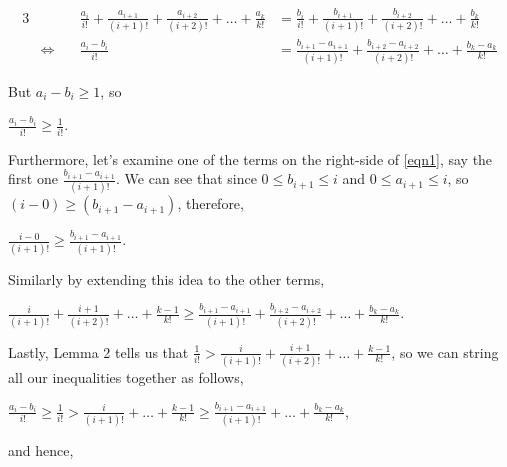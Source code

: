 \documentclass{article}
\begin{document}
{\footnotesize
\bgroup
\setlength{\abovedisplayskip}{0pt}
\setlength{\belowdisplayskip}{0pt}
\begin{alignat}{3}
  &&\frac{a_i}{i!}
  + \frac{a_{i+1}}{(i+1)!}
  + \frac{a_{i+2}}{(i+2)!}
  + \dots{}
  + \frac{a_k}{k!}
  &= \frac{b_i}{i!}
  + \frac{b_{i+1}}{(i+1)!}
  + \frac{b_{i+2}}{(i+2)!}
  + \dots{}
  + \frac{b_k}{k!} \nonumber \\
  &\Leftrightarrow\quad &\frac{a_i - b_i}{i!}
  &= \frac{b_{i+1} - a_{i+1}}{(i+1)!}
  + \frac{b_{i+2} - a_{i+2}}{(i+2)!}
  + \dots{}
  + \frac{b_k - a_k}{k!} \label{eqn1}
\end{alignat}
\egroup
}%

But \(a_i - b_i \ge{} 1\), so

\begin{center}
\(\frac{a_i - b_i}{i!} \ge{} \frac{1}{i!}\).
\end{center}

Furthermore, let's examine
one of the terms
on the right-side of \eqref{eqn1}, say
the first one \(\frac{b_{i+1} - a_{i+1}}{(i+1)!}\). We can see that since
\(0 \le b_{i+1} \le{} i\) and \(0 \le a_{i+1} \le{} i\), so \((i - 0) \ge{} (b_{i+1} - a_{i+1})\), therefore,

\begin{center}
\(\frac{i - 0}{(i+1)!} \ge{} \frac{b_{i+1} - a_{i+1}}{(i+1)!}\).
\end{center}

Similarly by extending this idea to the other terms,

\begin{center}
\(
\frac{i}{(i+1)!}
+ \frac{i+1}{(i+2)!}
+ \dots{} + \frac{k-1}{k!} \ge{}
\frac{b_{i+1} - a_{i+1}}{(i+1)!}
+ \frac{b_{i+2} - a_{i+2}}{(i+2)!}
+ \dots{} + \frac{b_k - a_k}{k!}\).
\end{center}

Lastly, Lemma 2 tells us that \(\frac{1}{i!} > 
\frac{i}{(i+1)!}
+ \frac{i+1}{(i+2)!}
+ \dots{} + \frac{k-1}{k!}\), so
we can string all our inequalities together as follows,

\begin{center}
\(\frac{a_i - b_i}{i!} \ge{} \frac{1}{i!} > \frac{i}{(i+1)!} + \dots{} + \frac{k-1}{k!} \ge{} \frac{b_{i+1} - a_{i+1}}{(i+1)!} + \dots{} + \frac{b_k - a_k}{k!}\),
\end{center}

and hence,
\end{document}
